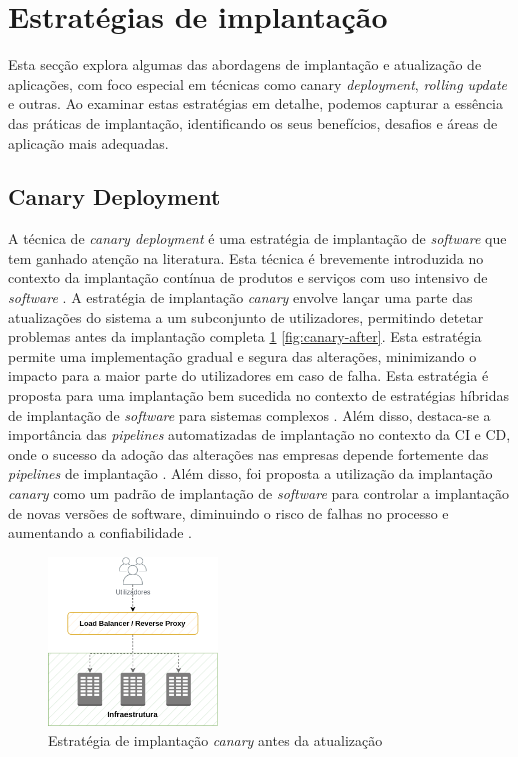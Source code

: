\section{Estratégias de implantação}

Esta secção explora algumas das abordagens de implantação e atualização de aplicações, com foco 
especial em técnicas como canary \textit{deployment}, \textit{rolling update} e outras. Ao examinar 
estas estratégias em detalhe, podemos capturar a essência das práticas de implantação, identificando 
os seus benefícios, desafios e áreas de aplicação mais adequadas. 

\subsection{Canary Deployment}

A técnica de \textit{canary deployment} é uma estratégia de implantação de \textit{software} que 
tem ganhado atenção na literatura. Esta técnica é brevemente introduzida no contexto da 
implantação contínua de produtos e serviços com uso intensivo de \textit{software} \cite{canary2017}. 
A estratégia de implantação \textit{canary} envolve lançar uma parte das atualizações do sistema a 
um subconjunto de utilizadores, permitindo detetar problemas antes da implantação completa 
\ref{fig:canary-before} \ref{fig:canary-after}. Esta estratégia permite uma implementação gradual 
e segura das alterações, minimizando o impacto para a maior parte do utilizadores em caso de falha. 
Esta estratégia é proposta para uma implantação bem sucedida no contexto de estratégias híbridas 
de implantação de \textit{software} para sistemas complexos \cite{canary2022}. Além disso, 
destaca-se a importância das \textit{pipelines} automatizadas de implantação no contexto da \ac{CI} 
e \ac{CD}, onde o sucesso da adoção das alterações nas empresas depende fortemente das 
\textit{pipelines} de implantação \cite{canary2017b}. Além disso, foi proposta a utilização da 
implantação \textit{canary} como um padrão de implantação de \textit{software} para controlar a 
implantação de novas versões de software, diminuindo o risco de falhas no processo e aumentando a 
confiabilidade \cite{canary2021}.

\begin{figure}[H]
    \centering
    \includegraphics[width=0.4\textwidth]{media/content/estado-arte/canary-before.png}
    \caption{Estratégia de implantação \textit{canary} antes da atualização}
    \label{fig:canary-before}
\end{figure}

